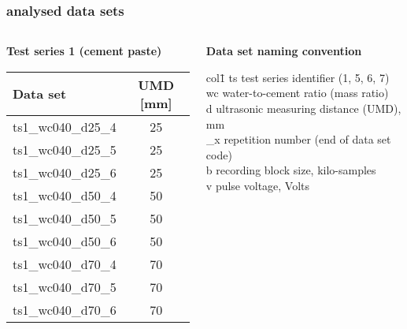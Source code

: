 	\begin{frame}
		\frametitle{\appendixname{} \textendash{} analysed data sets}\label{app:dataset:ts1}
		\small
		\begin{columns}[t]
			\begin{column}{.5\textwidth}
				\textbf{Test series 1 (cement paste)}\autocite{ts1data}\\
				\vspace*{1em}
				\begin{tabular}{l c}
					\toprule
					Data set           & UMD [mm] \\ \midrule
					ts1\_wc040\_d25\_4 & 25       \\
					ts1\_wc040\_d25\_5 & 25       \\
					ts1\_wc040\_d25\_6 & 25       \\
					ts1\_wc040\_d50\_4 & 50       \\
					ts1\_wc040\_d50\_5 & 50       \\
					ts1\_wc040\_d50\_6 & 50       \\
					ts1\_wc040\_d70\_4 & 70       \\
					ts1\_wc040\_d70\_5 & 70       \\
					ts1\_wc040\_d70\_6 & 70       \\ \bottomrule
				\end{tabular}
			\end{column}
			\begin{column}{.5\textwidth}
				\textbf{Data set naming convention}
				\begin{tabbing}
					col1\quad\= \kill
					ts \> test series identifier (1, 5, 6, 7) \\
					wc \> water-to-cement ratio (mass ratio) \\
					d  \> ultrasonic measuring distance (UMD), mm \\
					\_x \> repetition number (end of data set code) \\
					b   \> recording block size, kilo-samples \\
					v   \> pulse voltage, Volts \\
				\end{tabbing}
			\end{column}
		\end{columns}
	\end{frame}

